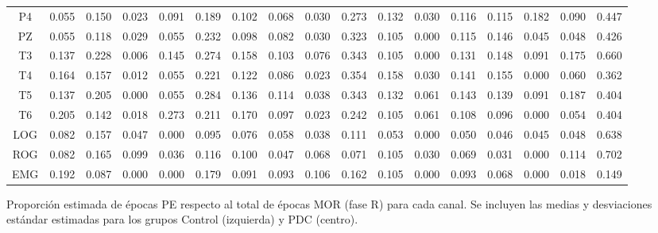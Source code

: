 \documentclass[12pt,a4paper]{mitthesis}
\begin{document}
\begin{SidewaysFigure}
\begin{tabular}{c||ccccc|cc||cccc|cc||ccc}
P4&0.055&0.150&0.023&0.091&0.189&0.102&0.068&0.030&0.273&0.132&0.030&0.116&0.115&0.182&0.090&0.447 \\
PZ&0.055&0.118&0.029&0.055&0.232&0.098&0.082&0.030&0.323&0.105&0.000&0.115&0.146&0.045&0.048&0.426 \\
T3&0.137&0.228&0.006&0.145&0.274&0.158&0.103&0.076&0.343&0.105&0.000&0.131&0.148&0.091&0.175&0.660 \\
T4&0.164&0.157&0.012&0.055&0.221&0.122&0.086&0.023&0.354&0.158&0.030&0.141&0.155&0.000&0.060&0.362 \\
T5&0.137&0.205&0.000&0.055&0.284&0.136&0.114&0.038&0.343&0.132&0.061&0.143&0.139&0.091&0.187&0.404 \\
T6&0.205&0.142&0.018&0.273&0.211&0.170&0.097&0.023&0.242&0.105&0.061&0.108&0.096&0.000&0.054&0.404 \\
LOG&0.082&0.157&0.047&0.000&0.095&0.076&0.058&0.038&0.111&0.053&0.000&0.050&0.046&0.045&0.048&0.638 \\
ROG&0.082&0.165&0.099&0.036&0.116&0.100&0.047&0.068&0.071&0.105&0.030&0.069&0.031&0.000&0.114&0.702 \\
EMG&0.192&0.087&0.000&0.000&0.179&0.091&0.093&0.106&0.162&0.105&0.000&0.093&0.068&0.000&0.018&0.149
\end{tabular}
\caption{Proporci\'on estimada de \'epocas PE respecto al total de \'epocas MOR (fase R) para cada
canal. Se incluyen las medias y desviaciones est\'andar estimadas para los grupos Control 
(izquierda) y PDC (centro).}
\label{gpos_mor}
\end{SidewaysFigure}

\end{document}
